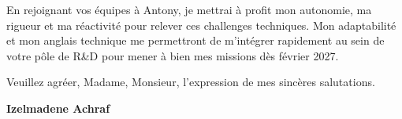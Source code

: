 \documentclass[10pt,a4paper]{altacv}
\begin{document}
\vspace{0.4cm}

En rejoignant vos équipes à Antony, je mettrai à profit mon autonomie, ma rigueur et ma réactivité pour relever ces challenges techniques. Mon adaptabilité et mon anglais technique me permettront de m'intégrer rapidement au sein de votre pôle de R\&D pour mener à bien mes missions dès février 2027.

\vspace{0.5cm}

Veuillez agréer, Madame, Monsieur, l'expression de mes sincères salutations.

\vfill

\begin{flushright}
  \Large\color{emphasis}\textbf{Izelmadene Achraf}
\end{flushright}
\end{document}
